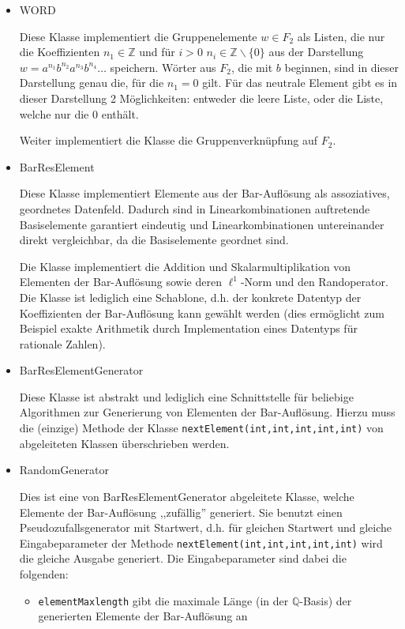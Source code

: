 \documentclass[a4paper,twoside,10pt]{scrreprt}
\newcommand{\Z}{\mathbb{Z}}
\newcommand{\Q}{\mathbb{Q}}
\theoremstyle{definition}
\begin{document}
\begin{itemize}
\item WORD\par
Diese Klasse implementiert die Gruppenelemente $w\in F_2$ als Listen, die nur die Koeffizienten $n_1\in \Z$ und für $i>0$ $n_i\in \Z\backslash\{0\}$ aus der Darstellung $w=a^{n_1}b^{n_2}a^{n_3}b^{n_4}\ldots$ speichern. Wörter aus $F_2$, die mit $b$ beginnen, sind in dieser Darstellung genau die, für die $n_1=0$ gilt. Für das neutrale Element gibt es in dieser Darstellung 2 Möglichkeiten: entweder die leere Liste, oder die Liste, welche nur die $0$ enthält.\par
Weiter implementiert die Klasse die Gruppenverknüpfung auf $F_2$.
\item BarResElement\par
Diese Klasse implementiert Elemente aus der Bar-Auflösung als assoziatives, geordnetes Datenfeld. Dadurch sind in Linearkombinationen auftretende Basiselemente garantiert eindeutig und Linearkombinationen untereinander direkt vergleichbar, da die Basiselemente geordnet sind.\par
Die Klasse implementiert die Addition und Skalarmultiplikation von Elementen der Bar-Auflösung sowie deren $\ell^1$-Norm und den Randoperator. Die Klasse ist lediglich eine Schablone, d.h. der konkrete Datentyp der Koeffizienten der Bar-Auflösung kann gewählt werden (dies ermöglicht zum Beispiel exakte Arithmetik durch Implementation eines Datentyps für rationale Zahlen).
\item BarResElementGenerator\par
Diese Klasse ist abstrakt und lediglich eine Schnittstelle für beliebige Algorithmen zur Generierung von Elementen der Bar-Auflösung. Hierzu muss die (einzige) Methode der Klasse \lstinline|nextElement(int,int,int,int,int)| von abgeleiteten Klassen überschrieben werden.
\item RandomGenerator\par
Dies ist eine von BarResElementGenerator abgeleitete Klasse, welche Elemente der Bar-Auflösung ,,zufällig'' generiert. Sie benutzt einen Pseudozufallsgenerator mit Startwert, d.h. für gleichen Startwert und gleiche Eingabeparameter der Methode \lstinline|nextElement(int,int,int,int,int)| wird die gleiche Ausgabe generiert. Die Eingabeparameter sind dabei die folgenden:
\begin{itemize}
\item \lstinline|elementMaxlength| gibt die maximale Länge (in der $\Q$-Basis) der generierten Elemente der Bar-Auflösung an

\end{itemize}
\end{itemize}
\end{document}
